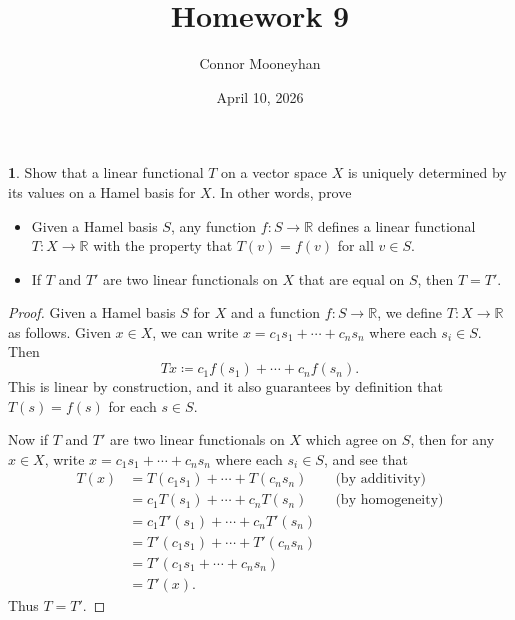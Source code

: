 \documentclass[12pt]{article}
\title{Homework 9}
\author{Connor Mooneyhan}
\date{April 10, 2026}
\theoremstyle{definition}
\newtheorem{ex}{}
\begin{document}
\maketitle

\begin{ex}
	Show that a linear functional $T$ on a vector space $X$ is uniquely determined by its values on a Hamel basis for $X$.
	In other words, prove \begin{itemize}
		\item Given a Hamel basis $S$, any function $f : S \to \mathbb{R}$ defines a linear functional $T: X \to \mathbb{R}$ with the property that $T(v) = f(v)$ for all $v \in S$.
		\item If $T$ and $T'$ are two linear functionals on $X$ that are equal on $S$, then $T = T'$.
	\end{itemize}
\end{ex}
\begin{proof}
	Given a Hamel basis $S$ for $X$ and a function $f : S \to \mathbb{R}$, we define $T : X \to \mathbb{R}$ as follows.
	Given $x \in X$, we can write $x = c_1s_1 + \cdots + c_ns_n$ where each $s_i \in S$.
	Then \begin{equation*}
		Tx \coloneq c_1f(s_1) + \cdots + c_nf(s_n).
	\end{equation*}
	This is linear by construction, and it also guarantees by definition that $T(s) = f(s)$ for each $s \in S$.

	Now if $T$ and $T'$ are two linear functionals on $X$ which agree on $S$, then for any $x \in X$, write $x = c_1s_1 + \cdots + c_ns_n$ where each $s_i \in S$, and see that \begin{align*}
		T(x) & = T(c_1s_1) + \cdots + T(c_ns_n) \hspace{2em}\text{(by additivity)}  \\
		     & = c_1T(s_1) + \cdots + c_nT(s_n) \hspace{2em}\text{(by homogeneity)} \\
		     & = c_1T'(s_1) + \cdots + c_nT'(s_n)                                   \\
		     & = T'(c_1s_1) + \cdots + T'(c_ns_n)                                   \\
		     & = T'(c_1s_1 + \cdots + c_ns_n)                                       \\
		     & = T'(x).
	\end{align*}
	Thus $T = T'$.
\end{proof}
\end{document}
